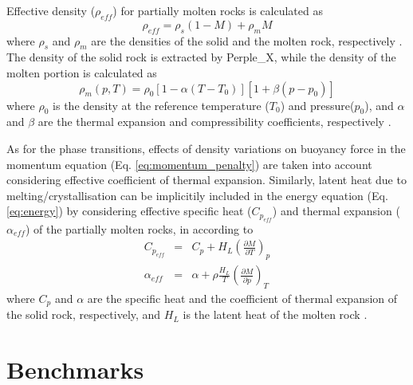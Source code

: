 \documentclass[hidelinks,11pt,a4paper]{article}
\begin{document}
Effective density ($\rho_{eff}$) for partially molten rocks is calculated as
\begin{equation}\label{eq:melt_dens}
\rho_{eff}=\rho_s(1-M)+\rho_m M
\end{equation}
where $\rho_s$ and $\rho_m$ are the densities of the solid and the molten rock, respectively \citep{Gerya2003a,Wang2016}. The density of the solid rock is extracted by Perple\_X, while the density of the molten portion is calculated as
\begin{equation}\label{eq:melt_dens_M}
\rho_m(p,T)=\rho_0[1-\alpha(T-T_0)][1+\beta(p-p_0)]
\end{equation}
where $\rho_0$ is the density at the reference temperature ($T_0$) and pressure($p_0$), and $\alpha$ and $\beta$ are the thermal expansion and compressibility coefficients, respectively \citep{Gerya2003a,Wang2016}.

As for the phase transitions, effects of density variations on buoyancy force in the momentum equation (Eq. \ref{eq:momentum_penalty}) are taken into account considering effective coefficient of thermal expansion. Similarly, latent heat due to melting/crystallisation can be implicitily included in the energy equation (Eq. \ref{eq:energy}) by considering effective specific heat ($C_{p_{eff}}$) and thermal expansion ($\alpha_{eff}$) of the partially molten rocks, in according to
\begin{eqnarray}
\label{eq:cp_effective}C_{p_{eff}}&=&C_p+H_L\left(\frac{\partial M}{\partial T}\right)_p \\
\label{eq:alpha_effective}\alpha_{eff}&=&\alpha+\rho\frac{H_L}{T}\left(\frac{\partial M}{\partial p}\right)_T
\end{eqnarray}
where $C_p$ and $\alpha$ are the specific heat and the coefficient of thermal expansion of the solid rock, respectively, and $H_L$ is the latent heat of the molten rock \citep{Gerya2003a,Gerya2007,Tackley2010}.

\section{Benchmarks}\label{sec:benchmark}
\end{document}
